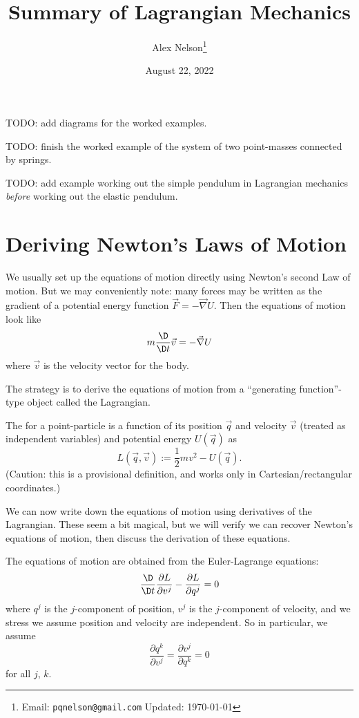 \title{Summary of Lagrangian Mechanics}
\author{Alex Nelson\footnote{Email: \texttt{pqnelson@gmail.com}\qquad
  Updated: \today}}
\date{August 22, 2022}
\maketitle

TODO: add diagrams for the worked examples.

TODO: finish the worked example of the system of two point-masses
connected by springs.

TODO: add example working out the simple pendulum in Lagrangian
mechanics \emph{before} working out the elastic pendulum.

\section{Deriving Newton's Laws of Motion}
\M
We usually set up the equations of motion directly using Newton's second
Law of motion. But we may conveniently note: many forces may be written
as the gradient of a potential energy function $\vec{F}=-\vec{\nabla}U$.
Then the equations of motion look like
\begin{equation}
m\frac{\D}{\D t}\vec{v} = -\vec{\nabla}U
\end{equation}
where $\vec{v}$ is the velocity vector for the body.

The strategy is to derive the equations of motion from a ``generating
function''-type object called the Lagrangian.

\begin{definition}
The  for a point-particle is a function of its
position $\vec{q}$ and velocity $\vec{v}$ (treated as independent
variables) and potential energy $U(\vec{q})$ as
\begin{equation}
L(\vec{q},\vec{v}) := \frac{1}{2}mv^{2} - U(\vec{q}).
\end{equation}
(Caution: this is a provisional definition, and works only in
Cartesian/rectangular coordinates.)
\end{definition}

We can now write down the equations of motion using derivatives of the
Lagrangian. These seem a bit magical, but we will verify we can recover
Newton's equations of motion, then discuss the derivation of these
equations.

The equations of motion are obtained from the Euler-Lagrange equations:
\begin{equation}
\frac{\D}{\D t}\frac{\partial L}{\partial v^{j}} - \frac{\partial L}{\partial q^{j}} = 0
\end{equation}
where $q^{j}$ is the $j$-component of position, $v^{j}$ is the
$j$-component of velocity, and we stress we assume position and velocity
are independent. So in particular, we assume
\begin{equation}
\frac{\partial q^{k}}{\partial v^{j}} = \frac{\partial v^{j}}{\partial q^{k}} = 0
\end{equation}
for all $j$, $k$.

